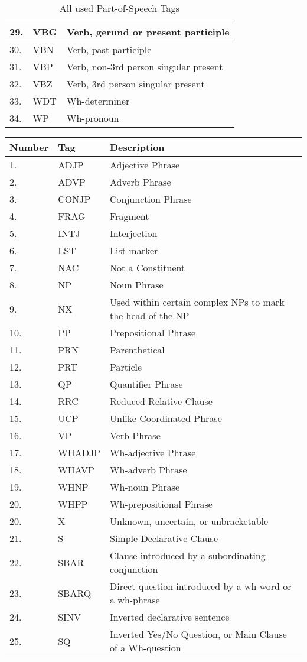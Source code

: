 \begin{table}[h]
\begin{tabular}{| l | l | l |}
29. & 	VBG &	Verb, gerund or present participle \\ \hline
30. & 	VBN &	Verb, past participle \\ \hline
31. & 	VBP &	Verb, non-3rd person singular present \\ \hline
32. & 	VBZ &	Verb, 3rd person singular present \\ \hline
33. & 	WDT & Wh-determiner \\ \hline
34. & 	WP &	Wh-pronoun  \\ \hline
    \end{tabular}
      \caption{All used Part-of-Speech Tags}
     \label{table:AllPOSTags}
\end{table}

\begin{table}[h]
	\centering
    \begin{tabular}{| l | l | l |}
    \hline
Number & Tag & Description \\ \hline
	\hline
1. & 	ADJP & Adjective Phrase \\ \hline
2. & 	ADVP & Adverb Phrase \\ \hline
3. & 	CONJP  &  Conjunction Phrase \\ \hline
4. & 	FRAG  & Fragment \\ \hline
5. & 	INTJ & Interjection \\ \hline
6. & 	LST  &	 List marker \\ \hline
7. & 	NAC & Not a Constituent \\ \hline
8. & 	NP &	Noun Phrase \\ \hline
9. & 	NX &	Used within certain complex NPs to mark the head of the NP \\ \hline
10. & 	PP &  Prepositional Phrase \\ \hline
11. & 	PRN &  Parenthetical \\ \hline
12. & 	PRT &	Particle \\ \hline
13. & 	QP & Quantifier Phrase\\ \hline
14. & 	RRC& 	 Reduced Relative Clause\\ \hline
15. & 	UCP & Unlike Coordinated Phrase \\ \hline
16. & 	VP & Verb Phrase \\ \hline
17. & 	WHADJP & Wh-adjective Phrase \\ \hline
18. & 	WHAVP & Wh-adverb Phrase \\ \hline
19. & 	WHNP & Wh-noun Phrase \\ \hline
20. & 	WHPP &	Wh-prepositional Phrase \\ \hline
20. & 	X & Unknown, uncertain, or unbracketable\\ \hline
 \hline
21. & 	S &  Simple Declarative Clause \\ \hline
22. & SBAR &   Clause introduced by a subordinating conjunction \\ \hline
23. & 	SBARQ &  Direct question introduced by a wh-word or a wh-phrase \\ \hline
24. & 	SINV &   Inverted declarative sentence \\ \hline
25. & SQ & Inverted Yes/No Question, or Main Clause of a Wh-question\\ \hline


\end{tabular}
\end{table}
